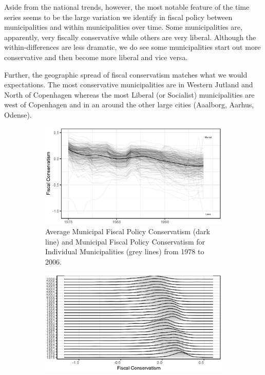 \documentclass[a4paper,12pt]{article}
\begin{document}
Aside from the national trends, however, the most notable feature of the time series seems to be the large variation we identify in fiscal policy between municipalities and within municipalities over time. Some municipalities are, apparently, very fiscally conservative while others are very liberal. Although the within-differences are less dramatic, we do see some municipalities start out more conservative and then become more liberal and vice versa.

Further, the geographic spread of fiscal conservatism matches what we would expectations. The most conservative municipalities are in Western Jutland and North of Copenhagen whereas the most Liberal (or Socialist) municipalities are west of Copenhagen and in an around the other large cities (Aaalborg, Aarhus, Odense).

	
\begin{figure}
\centering 
	\begin{subfigure}[h]{0.38\textwidth} 
	\includegraphics[width=1\textwidth]{newtimes_lines.eps}
	\caption{Average Municipal Fiscal Policy Conservatism (dark line) and Municipal Fiscal Policy Conservatism for Individual Municipalities (grey lines) from 1978 to 2006.}
	\label{fig:timeline}
			\end{subfigure} \hspace{1cm}
		\begin{subfigure}{0.38\textwidth} 
	\includegraphics[width=1\textwidth]{newJoyPlotFiscal.eps}

\end{subfigure}
\end{figure}
\end{document}
